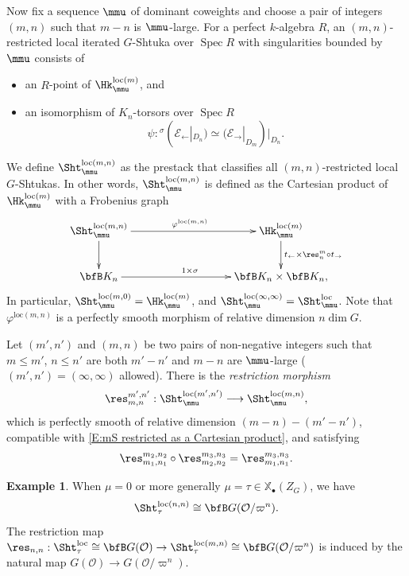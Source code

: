 \documentclass[11pt]{amsart}
\theoremstyle{definition}
\theoremstyle{definition}
\newtheorem{ex}[thm]{Example}
\theoremstyle{definition}
\numberwithin{equation}{subsection}
\newcommand{\mE}{{\mathcal E}}
\newcommand{\mO}{{\mathcal O}}
\DeclareMathOperator{\Spec}{Spec}
\newcommand{\loc}{\mathrm{loc}}
\newcommand{\longto}{\longrightarrow}
\def\xcoch{\mathbb{X}_\bullet}
\newcommand{\leftone}{\leftarrow}
\newcommand{\rightone}{\to}
\begin{document}
Now fix a sequence $\mmu$ of dominant coweights and choose a pair of integers $(m,n)$ such that $m-n$ is $\mmu$-large.
For a perfect $k$-algebra $R$, an $(m,n)$-restricted  local iterated $G$-Shtuka over $\Spec R$ with singularities bounded by $\mmu$ consists of
\begin{itemize}
\item an $R$-point of $ \Hk^{\loc(m)}_\mmu$,  and 
\item an isomorphism of $K_n$-torsors over $\Spec R$
$$\psi:{^\sigma} (\mE_\leftone|_{D_{n}}) \simeq(\mE_\rightone|_{D_{m}})|_{D_{n}}.$$ 
\end{itemize}
We define $\Sht^{\loc(m,n)}_\mmu$ as the prestack that classifies all $(m,n)$-restricted local $G$-Shtukas.  In other words, $\Sht_\mmu^{\loc(m,n)}$ is defined as the Cartesian product of $\Hk_\mmu^{\loc(m)}$ with a Frobenius graph
\begin{equation}
\label{E:mS restricted as a Cartesian product}
\xymatrix@C=90pt{
\Sht_\mmu^{\loc(m,n)} \ar[r]^{\varphi^{\loc(m,n)}} \ar[d]
&  \Hk_\mmu^{\loc(m)} \ar[d]^-{ t_\leftone\times \res^{m}_{n}\circ t_\rightone }
\\ \bfB K_n \ar[r]^{1\times \sigma} & \bfB K_n \times \bfB K_n,
}
\end{equation}
In particular, $\Sht_\mmu^{\loc(m,0)}=\Hk_\mmu^{\loc(m)}$, and $\Sht_\mmu^{\loc(\infty,\infty)}=\Sht_\mmu^\loc$.
Note that $\varphi^{\loc(m,n)}$ is a perfectly smooth morphism of relative dimension $n \dim G$. 
 
 Let $(m',n')$ and $(m,n)$ be two pairs of non-negative integers such that $m\leq m'$, $n\leq n'$ are both $m'-n'$ and $m-n$ are $\mmu$-large ($(m',n')=(\infty,\infty)$ allowed). 
There is the \emph{restriction morphism}
\begin{equation}\label{trunc}
\res^{m',n'}_{m,n}: \Sht^{\loc(m',n')}_\mmu\longto \Sht_\mmu^{\loc(m,n)},
\end{equation}
which is perfectly smooth of relative dimension $(m-n)-(m'-n')$, compatible with \eqref{E:mS restricted as a Cartesian product}, and satisfying
\begin{equation}
\label{true-to-trun}
\res^{m_2,n_2}_{m_1,n_1}\circ\res^{m_3,n_3}_{m_2,n_2}=\res^{m_3,n_3}_{m_1,n_1}.
\end{equation} 
 
\begin{ex}
\label{Ex:mStau mn}
When $\mu=0$ or more generally $\mu=\tau\in\xcoch(Z_G)$, we have 
$$\Sht^{\loc(n,n)}_\tau\cong \bfB G(\mO/\varpi^n).$$ 
The restriction map $\res_{n,n}: \Sht_\tau^\loc\cong\bfB G(\mO)\to \Sht_\tau^{\loc(m,n)}\cong\bfB G(\mO/\varpi^n)$ is induced by the natural map $G(\mO)\to G(\mO/\varpi^n)$.

\end{ex}
\end{document}

